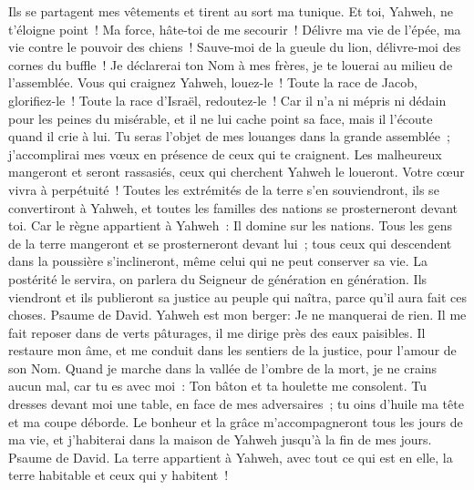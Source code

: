 \begin{multicols}{2}
Ils se partagent mes vêtements et tirent au sort ma tunique.
Et toi, Yahweh, ne t'éloigne point~! Ma force, hâte-toi de me secourir~!
Délivre ma vie de l'épée, ma vie contre le pouvoir des chiens~!
Sauve-moi de la gueule du lion, délivre-moi des cornes du buffle~!
Je déclarerai ton Nom à mes frères, je te louerai au milieu de l'assemblée.
Vous qui craignez Yahweh, louez-le~! Toute la race de Jacob, glorifiez-le~! Toute la race d'Israël, redoutez-le~!
Car il n'a ni mépris ni dédain pour les peines du misérable, et il ne lui cache point sa face, mais il l'écoute quand il crie à lui.
Tu seras l'objet de mes louanges dans la grande assemblée~; j'accomplirai mes vœux en présence de ceux qui te craignent.
Les malheureux mangeront et seront rassasiés, ceux qui cherchent Yahweh le loueront. Votre cœur vivra à perpétuité~!
Toutes les extrémités de la terre s'en souviendront, ils se convertiront à Yahweh, et toutes les familles des nations se prosterneront devant toi.
Car le règne appartient à Yahweh~: Il domine sur les nations.
Tous les gens de la terre mangeront et se prosterneront devant lui~; tous ceux qui descendent dans la poussière s'inclineront, même celui qui ne peut conserver sa vie.
La postérité le servira, on parlera du Seigneur de génération en génération.
Ils viendront et ils publieront sa justice au peuple qui naîtra, parce qu'il aura fait ces choses.
\VerseOne{}Psaume de David. Yahweh est mon berger: Je ne manquerai de rien.
Il me fait reposer dans de verts pâturages, il me dirige près des eaux paisibles.
Il restaure mon âme, et me conduit dans les sentiers de la justice, pour l'amour de son Nom.
Quand je marche dans la vallée de l'ombre de la mort, je ne crains aucun mal, car tu es avec moi~: Ton bâton et ta houlette me consolent.
Tu dresses devant moi une table, en face de mes adversaires~; tu oins d'huile ma tête et ma coupe déborde.
Le bonheur et la grâce m'accompagneront tous les jours de ma vie, et j'habiterai dans la maison de Yahweh jusqu'à la fin de mes jours.
\VerseOne{}Psaume de David. La terre appartient à Yahweh, avec tout ce qui est en elle, la terre habitable et ceux qui y habitent~!

\end{multicols}
